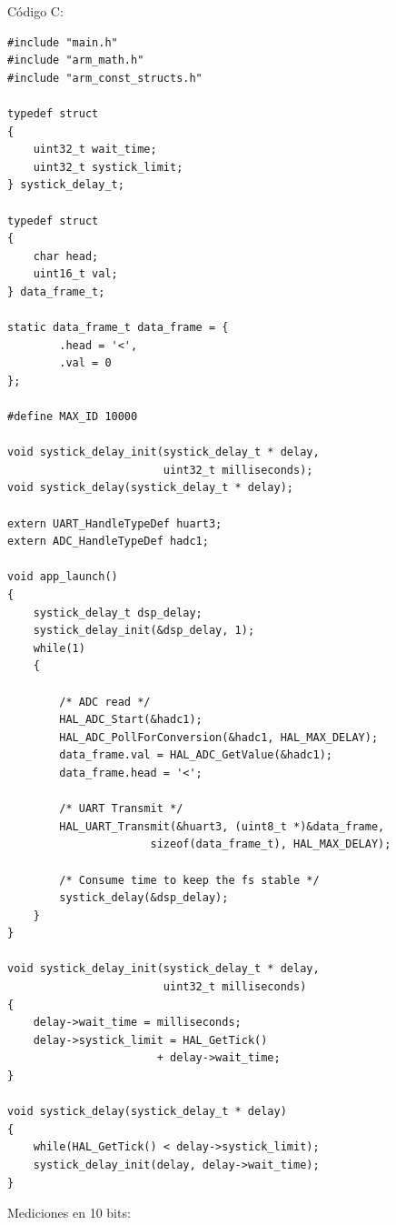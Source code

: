 \documentclass[
    11pt,
    spanish,
	a4paper
]{article}
\begin{document}
Código C:

\begin{lstlisting}
#include "main.h"
#include "arm_math.h"
#include "arm_const_structs.h"

typedef struct
{
	uint32_t wait_time;
	uint32_t systick_limit;
} systick_delay_t;

typedef struct
{
	char head;
	uint16_t val;
} data_frame_t;

static data_frame_t data_frame = {
		.head = '<',
		.val = 0
};

#define MAX_ID 10000

void systick_delay_init(systick_delay_t * delay,
                        uint32_t milliseconds);
void systick_delay(systick_delay_t * delay);

extern UART_HandleTypeDef huart3;
extern ADC_HandleTypeDef hadc1;

void app_launch()
{
	systick_delay_t dsp_delay;
	systick_delay_init(&dsp_delay, 1);
	while(1)
	{

		/* ADC read */
		HAL_ADC_Start(&hadc1);
		HAL_ADC_PollForConversion(&hadc1, HAL_MAX_DELAY);
		data_frame.val = HAL_ADC_GetValue(&hadc1);
		data_frame.head = '<';

		/* UART Transmit */
		HAL_UART_Transmit(&huart3, (uint8_t *)&data_frame,
                      sizeof(data_frame_t), HAL_MAX_DELAY);

		/* Consume time to keep the fs stable */
		systick_delay(&dsp_delay);
	}
}

void systick_delay_init(systick_delay_t * delay,
                        uint32_t milliseconds)
{
	delay->wait_time = milliseconds;
	delay->systick_limit = HAL_GetTick()
                       + delay->wait_time;
}

void systick_delay(systick_delay_t * delay)
{
	while(HAL_GetTick() < delay->systick_limit);
	systick_delay_init(delay, delay->wait_time);
}
\end{lstlisting}

Mediciones en 10 bits:
\end{document}
